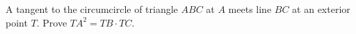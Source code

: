 A tangent to the circumcircle of triangle $ABC$ at $A$ meets line $BC$ at an exterior point $T$. Prove $TA^2=TB\cdot TC$.
